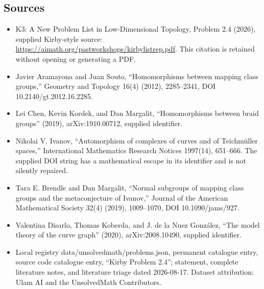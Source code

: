 \documentclass[11pt]{article}
\begin{document}
\subsection{Sources}
\begin{itemize}
\item K3: A New Problem List in Low-Dimensional Topology, Problem 2.4 (2026), supplied Kirby-style source: \url{https://aimath.org/pastworkshops/kirbylistrep.pdf}. This citation is retained without opening or generating a PDF.
\item [AS12] Javier Aramayona and Juan Souto, ``Homomorphisms between mapping class groups,'' Geometry and Topology 16(4) (2012), 2285--2341, DOI 10.2140/gt.2012.16.2285.
\item [CKM19] Lei Chen, Kevin Kordek, and Dan Margalit, ``Homomorphisms between braid groups'' (2019), arXiv:1910.00712, supplied identifier.
\item [Iva97] Nikolai V. Ivanov, ``Automorphism of complexes of curves and of Teichmüller spaces,'' International Mathematics Research Notices 1997(14), 651--666. The supplied DOI string has a mathematical escape in its identifier and is not silently repaired.
\item [BM19] Tara E. Brendle and Dan Margalit, ``Normal subgroups of mapping class groups and the metaconjecture of Ivanov,'' Journal of the American Mathematical Society 32(4) (2019), 1009--1070, DOI 10.1090/jams/927.
\item [DKdlNG20] Valentina Disarlo, Thomas Koberda, and J. de la Nuez González, ``The model theory of the curve graph'' (2020), arXiv:2008.10490, supplied identifier.
\item Local registry data/unsolvedmath/problems.json, permanent catalogue entry, source code catalogue entry, ``Kirby Problem 2.4''; statement, complete literature notes, and literature triage dated 2026-08-17. Dataset attribution: Ulam AI and the UnsolvedMath Contributors.
\end{itemize}
\end{document}
